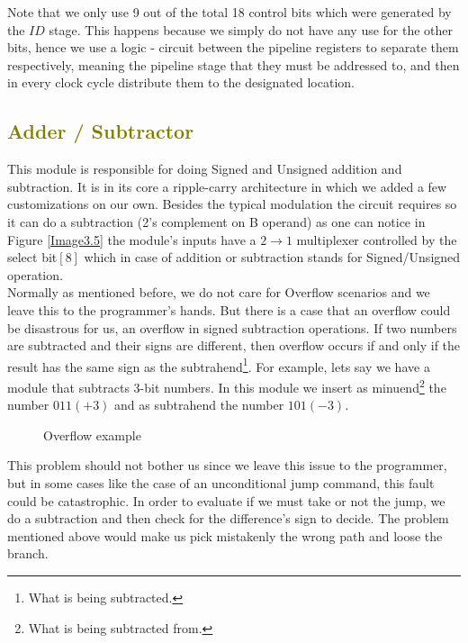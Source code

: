 	\clearpage
	\small
	Note that we only use 9 out of the total 18 control bits which were generated by the $ID$ stage. This happens because we simply do not have any use for the other bits, hence we use a logic - circuit between the pipeline registers  to separate them respectively, meaning the pipeline stage that they must be addressed to, and then in every clock cycle distribute them to the designated location.
	
	\subsection{\textcolor{olive}{Adder / Subtractor}}
	\label{SubSec3.3.2:ADD/SUB}
	This module is responsible for doing Signed and Unsigned addition and subtraction. It is in its core a ripple-carry architecture in which we added a few customizations on our own. Besides the typical modulation the circuit requires so it can do a subtraction (2's complement on B operand) as one can notice in Figure \ref{Image3.5} the module's inputs have a $2\rightarrow1$ multiplexer controlled by the select bit$[8]$ which in case of addition or subtraction stands for Signed/Unsigned operation. \\
	
	Normally as mentioned before, we do not care for Overflow scenarios and we leave this to the programmer's hands. But there is a case that an overflow could be disastrous for us, an overflow in signed subtraction operations. If two numbers are subtracted and their signs are different, then overflow occurs if and only if the result has the same sign as the subtrahend\footnote{What is being subtracted.}. For example, lets say we have a module that subtracts 3-bit numbers. In this module we insert as minuend\footnote{What is being subtracted from.} 
	the number $011 (+3)$ and as subtrahend the number $101 (-3)$. 
	
	\begin{figure}[h!]
		\begin{center}
			\caption{Overflow example}
			\label{Image3.6}
		\end{center}
	\end{figure}
	\vspace{-4mm}
	
	This problem should not bother us since we leave this issue to the programmer, but in some cases like the case of an unconditional jump command, this fault could be catastrophic. In order to evaluate if we must take or not the jump, we do a subtraction and then check for the difference's sign to decide. The problem mentioned above would make us pick mistakenly the wrong path and loose the branch.\\
	
